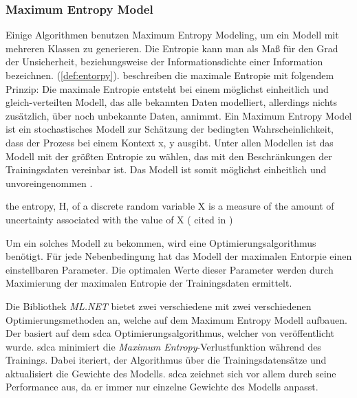\subsubsection{Maximum Entropy Model}
\label{c:conception:classification:multiclass:maximum-entropy}
Einige Algorithmen benutzen Maximum Entropy Modeling, um ein Modell mit mehreren Klassen zu generieren. Die Entropie kann man als Maß für den Grad der Unsicherheit, beziehungsweise der Informationsdichte einer Information bezeichnen. (\autoref{def:entorpy}). \cite{maximumentorpy1996} beschreiben die maximale Entropie mit folgendem Prinzip: Die maximale Entropie entsteht bei einem möglichst einheitlich und gleich-verteilten Modell, das alle bekannten Daten modelliert, allerdings nichts zusätzlich, über noch unbekannte Daten, annimmt. Ein Maximum Entropy Model ist ein stochastisches Modell zur Schätzung der bedingten Wahrscheinlichkeit, dass der Prozess bei einem Kontext x, y ausgibt. Unter allen Modellen ist das Modell mit der größten Entropie zu wählen, das mit den Beschränkungen der Trainingsdaten vereinbar ist. Das Modell ist somit möglichst einheitlich und unvoreingenommen \citep[vgl.][]{maximumentorpy1996}.

\begin{definition}[Entropie]
	\label{def:entorpy}
	\glqq the entropy, H, of a discrete random variable X is a measure of the amount of uncertainty associated with the value of X \grqq{} (\cite{shannon1948} cited in \cite{sep-information})
\end{definition}

Um ein solches Modell zu bekommen, wird eine Optimierungsalgorithmus benötigt.
Für jede Nebenbedingung hat das Modell der maximalen Entorpie einen einstellbaren Parameter. Die optimalen Werte dieser Parameter werden durch Maximierung der maximalen Entropie der Trainingsdaten ermittelt. \citep[vgl.][]{maximumentorpy1996}

Die Bibliothek \textit{ML.NET} bietet zwei verschiedene  mit zwei verschiedenen Optimierungsmethoden an, welche auf dem Maximum Entropy Modell aufbauen.
Der  basiert auf dem 
\ac{sdca} Optimierungsalgorithmus, welcher von \cite{shalevshwartz2013stochastic} veröffentlicht wurde. \ac{sdca} minimiert die \textit{Maximum Entropy}-Verlustfunktion während des Trainings. Dabei iteriert, der Algorithmus über die Trainingsdatensätze und aktualisiert die Gewichte des Modells. \ac{sdca} zeichnet sich vor allem durch seine Performance aus, da er immer nur einzelne Gewichte des Modells anpasst. \citep[vgl.][]{shalevshwartz2013stochastic,sdcatrainer_doc2022}

